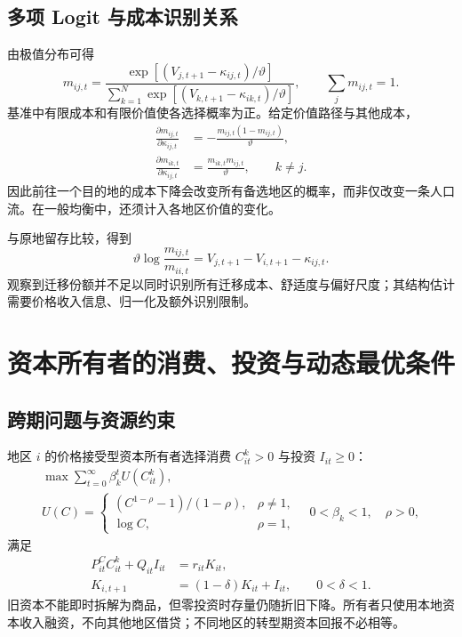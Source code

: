 \documentclass[UTF8,a4paper,zihao=-4,fontset=windows]{ctexart}
\numberwithin{equation}{section}
\newcommand{\pc}{P^{C}}
\newcommand{\invp}{Q}
\begin{document}
\subsection{多项 Logit 与成本识别关系}
由极值分布可得
\begin{equation}
 m_{ij,t}=\frac{\exp[(V_{j,t+1}-\kappa_{ij,t})/\vartheta]}
 {\sum_{k=1}^N\exp[(V_{k,t+1}-\kappa_{ik,t})/\vartheta]},
 \qquad\sum_jm_{ij,t}=1.
 \label{eq:lg-migration-share}
\end{equation}
基准中有限成本和有限价值使各选择概率为正。给定价值路径与其他成本，
\begin{align}
 \frac{\partial m_{ij,t}}{\partial\kappa_{ij,t}}
 &=-\frac{m_{ij,t}(1-m_{ij,t})}{\vartheta},\\
 \frac{\partial m_{ik,t}}{\partial\kappa_{ij,t}}
 &=\frac{m_{ik,t}m_{ij,t}}{\vartheta},\qquad k\neq j.
\end{align}
因此前往一个目的地的成本下降会改变所有备选地区的概率，而非仅改变一条人口流。在一般均衡中，还须计入各地区价值的变化。

与原地留存比较，得到
\begin{equation}
 \vartheta\log\frac{m_{ij,t}}{m_{ii,t}}
 =V_{j,t+1}-V_{i,t+1}-\kappa_{ij,t}.
 \label{eq:lg-migration-identification}
\end{equation}
观察到迁移份额并不足以同时识别所有迁移成本、舒适度与偏好尺度；其结构估计需要价格收入信息、归一化及额外识别限制。

\section{资本所有者的消费、投资与动态最优条件}
\label{sec:lg-capital}

\subsection{跨期问题与资源约束}
地区 $i$ 的价格接受型资本所有者选择消费 $C^k_{it}>0$ 与投资 $I_{it}\geq0$：
\begin{equation}
 \begin{gathered}
 \max\sum_{t=0}^{\infty}\beta_k^tU(C^k_{it}),\\
 U(C)=\begin{cases}
 (C^{1-\rho}-1)/(1-\rho),&\rho\neq1,\\
 \log C,&\rho=1,
 \end{cases}
 \quad 0<\beta_k<1,\quad\rho>0,
 \end{gathered}
 \label{eq:lg-capital-objective}
\end{equation}
满足
\begin{align}
 \pc_{it}C^k_{it}+\invp_{it}I_{it}&=r_{it}K_{it},
 \label{eq:lg-capital-budget}\\
 K_{i,t+1}&=(1-\delta)K_{it}+I_{it},\qquad0<\delta<1.
 \label{eq:lg-capital-law}
\end{align}
旧资本不能即时拆解为商品，但零投资时存量仍随折旧下降。所有者只使用本地资本收入融资，不向其他地区借贷；不同地区的转型期资本回报不必相等。
\end{document}
